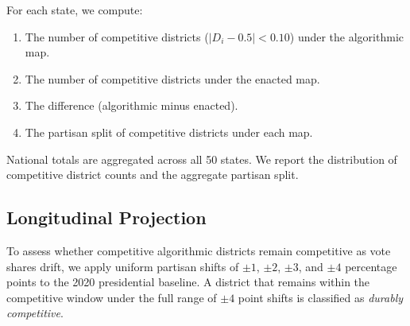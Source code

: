 For each state, we compute:
\begin{enumerate}
  \item The number of competitive districts ($|D_i - 0.5| < 0.10$) under the
    algorithmic map.
  \item The number of competitive districts under the enacted map.
  \item The difference (algorithmic minus enacted).
  \item The partisan split of competitive districts under each map.
\end{enumerate}

National totals are aggregated across all 50 states.  We report the
distribution of competitive district counts and the aggregate partisan split.

\subsection{Longitudinal Projection}

To assess whether competitive algorithmic districts remain competitive as vote
shares drift, we apply uniform partisan shifts of $\pm 1$, $\pm 2$, $\pm 3$,
and $\pm 4$ percentage points to the 2020 presidential baseline.  A district
that remains within the competitive window under the full range of $\pm 4$
point shifts is classified as \emph{durably competitive}.
